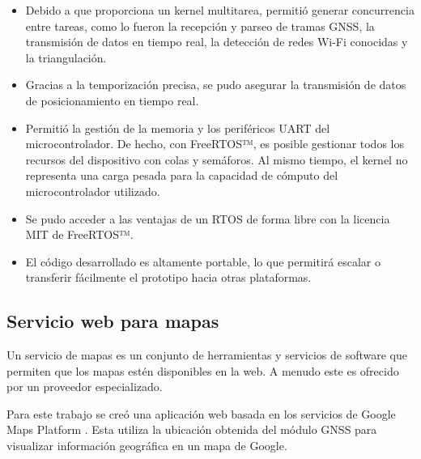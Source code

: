 \begin{itemize}
    \item Debido a que proporciona un kernel multitarea, permitió generar concurrencia entre tareas, como lo fueron la recepción y parseo de tramas GNSS, la transmisión de datos en tiempo real, la detección de redes Wi-Fi conocidas y la triangulación.  
    \item Gracias a la temporización precisa, se pudo asegurar la transmisión de datos de posicionamiento en tiempo real. 
    \item Permitió la gestión de la memoria y los periféricos UART del microcontrolador. De hecho, con FreeRTOS™, es posible gestionar todos los recursos del dispositivo con colas y semáforos. Al mismo tiempo, el kernel no representa una carga pesada para la capacidad de cómputo del microcontrolador utilizado. 
    \item Se pudo acceder a las ventajas de un RTOS de forma libre con la licencia MIT de FreeRTOS™.
    \item El código desarrollado es altamente portable, lo que permitirá escalar o transferir fácilmente el prototipo hacia otras plataformas. 
\end{itemize}



\subsection{Servicio web para mapas}
\label{sec:mapas_web}

Un servicio de mapas es un conjunto de herramientas y servicios de software que permiten que los mapas estén disponibles en la web. A menudo este es ofrecido por un proveedor especializado. 

Para este trabajo se creó una aplicación web basada en los servicios de Google Maps Platform \citep{GoogleMaps}. Esta utiliza la ubicación obtenida del módulo GNSS para visualizar información geográfica en un mapa de Google. 
